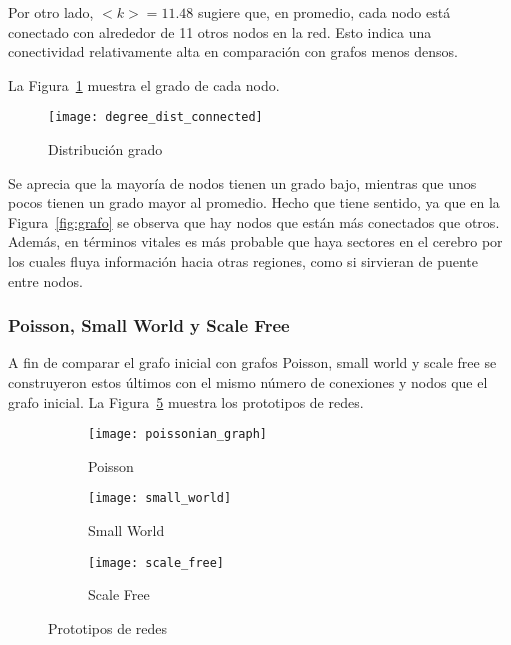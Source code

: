 \documentclass{article}
\begin{document}
Por otro lado, $<k> = 11.48$ sugiere que, en promedio, cada nodo está conectado con alrededor de 11 otros nodos en la red.
Esto indica una conectividad relativamente alta en comparación con grafos menos densos.

La Figura~\ref{fig:grado} muestra el grado de cada nodo.

\begin{figure}[h!]
  \centering
  \texttt{[image: degree\_dist\_connected]}
  \caption{Distribución grado}
  \label{fig:grado}
\end{figure}

Se aprecia que la mayoría de nodos tienen un grado bajo, mientras que unos pocos tienen un grado mayor al promedio.
Hecho que tiene sentido, ya que en la Figura~\ref{fig:grafo} se observa que hay nodos que están más conectados que otros.
Además, en términos vitales es más probable que haya sectores en el cerebro por los cuales fluya información hacia otras regiones, como si sirvieran de puente entre nodos.

\subsubsection{Poisson, Small World y Scale Free}\label{subsubsec:poisson-small-world-y-scale-free}

A fin de comparar el grafo inicial con grafos Poisson, small world y scale free se construyeron estos últimos con el mismo número de conexiones y nodos que el grafo inicial.
La Figura~\ref{fig:prototipos} muestra los prototipos de redes.

\begin{figure}[h!]
  \centering
  \begin{subfigure}[H]{0.2\textwidth}
    \centering
    \texttt{[image: poissonian\_graph]}
    \caption{Poisson}
    \label{fig:poisson}
  \end{subfigure}
  \begin{subfigure}[H]{0.2\textwidth}
      \centering
      \texttt{[image: small\_world]}
      \caption{Small World}
      \label{fig:small_world}
  \end{subfigure}
  \begin{subfigure}[H]{0.2\textwidth}
      \centering
      \texttt{[image: scale\_free]}
      \caption{Scale Free}
    \label{fig:scale_free}
  \end{subfigure}
    \caption{Prototipos de redes}
    \label{fig:prototipos}
\end{figure}
\end{document}
